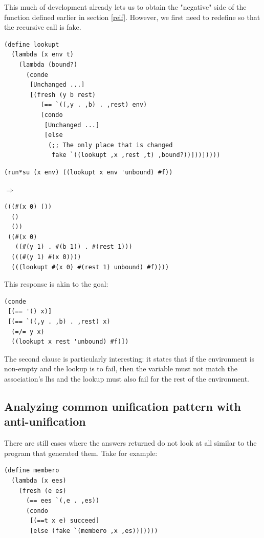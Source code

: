 This much of development already lets us to obtain the "negative" side of the  function defined earlier in section \ref{reif}. However, we first need to redefine  so that the recursive call is fake.
\begin{lstlisting}
(define lookupt
  (lambda (x env t)
    (lambda (bound?)
      (conde
       [Unchanged ...]
       [(fresh (y b rest)
          (== `((,y . ,b) . ,rest) env)
          (condo
           [Unchanged ...]
           [else
            (;; The only place that is changed
             fake `((lookupt ,x ,rest ,t) ,bound?))]))]))))
\end{lstlisting}

\begin{lstlisting}
(run*su (x env) ((lookupt x env 'unbound) #f))
\end{lstlisting}
$\Rightarrow$
\begin{lstlisting}
(((#(x 0) ()) 
  () 
  ())
 ((#(x 0) 
   ((#(y 1) . #(b 1)) . #(rest 1)))
  (((#(y 1) #(x 0))))
  (((lookupt #(x 0) #(rest 1) unbound) #f))))
\end{lstlisting}
This response is akin to the goal:
\begin{lstlisting}
(conde
 [(== '() x)]
 [(== `((,y . ,b) . ,rest) x)
  (=/= y x)
  ((lookupt x rest 'unbound) #f)])
\end{lstlisting}
The second clause is particularly interesting: it states that if the environment is non-empty and the lookup is to fail, then the variable  must not match the association's lhs and the lookup must also fail for the rest of the environment.

\subsection{Analyzing common unification pattern with anti-unification}\label{au}
There are still cases where the answers returned do not look at all similar to the program that generated them. Take  for example:
\begin{lstlisting}
(define membero
  (lambda (x ees)
    (fresh (e es)
      (== ees `(,e . ,es))
      (condo
       [(==t x e) succeed]
       [else (fake `(membero ,x ,es))]))))
\end{lstlisting}

